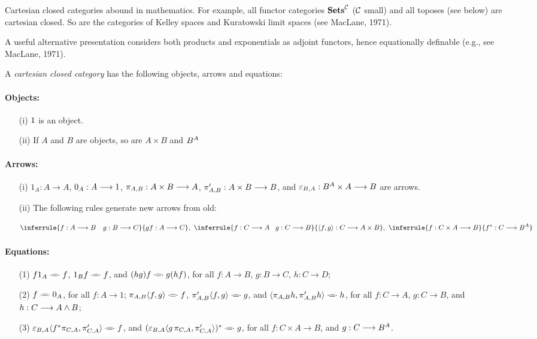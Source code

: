 Cartesian closed categories abound in mathematics. For example, all
functor categories ${\mathbf {Sets}}^{\mathcal C}$ ($\mathcal C$ small) and all toposes (see below) are cartesian
closed. So are the categories of Kelley spaces and Kuratowski limit spaces
(see MacLane, 1971).

A useful alternative presentation considers both products and exponentials
as adjoint functors, hence equationally definable (e.g., see MacLane, 1971).

\def\deq{\mathop{\cdot\mkern-5mu=\mkern-5mu\cdot}}

\begin{defn}
A {\em cartesian closed category} has the following objects,
arrows and equations:

\paragraph{Objects:}
\begin{enumerate}
\item[(i)] $1$ is an object.
\item[(ii)] If $A$ and $B$ are objects, so are $A \times B$ and $B^{A}$
\end{enumerate}

\paragraph{Arrows:}
\begin{enumerate}
\item[(i)] $1_A: A \to A$, $0_A: A \longrightarrow 1$, $\pi_{A,B}: A \times B \longrightarrow A$, 
$\pi'_{A,B}: A \times B \longrightarrow B$,
and $\varepsilon_{B,A}: B^{A} \times A \longrightarrow B$ are arrows.

\item[(ii)] The following rules generate new arrows from old:

\[
\inferrule {f: A \to B \quad g: B \to C}{gf: A \to C},\,\,
\inferrule {f: C \to A \quad\! g: C \to B}{\la f, g \ra: C \to A \times B}, \,\,
\inferrule {f: C \times A \to B}{f^*: C \to \fexpBA}
\]

\end{enumerate}

\paragraph{Equations:}
\begin{enumerate}
\item[(1)] $f1_A \mathrel{\cdot\!\!=\!\!\cdot} f$, $1_Bf \mathrel{\cdot\!\!=\!\!\cdot} f$, and $(hg)f \mathrel{\cdot\!\!=\!\!\cdot} g(hf)$,
for all $f:A \to B$, $g:B \to C$, $h: C\to D$;
\item[(2)] $f \mathrel{\cdot\!\!=\!\!\cdot} 0_A$, for all $f: A \to 1$;
$\pi_{A,B}\langle f,g \rangle \mathrel{\cdot\!\!=\!\!\cdot} f$, $\pi'_{A,B}\langle f,g \rangle \mathrel{\cdot\!\!=\!\!\cdot} g$, and
$\langle\pi_{A,B} h, \pi'_{A,B} h\rangle \mathrel{\cdot\!\!=\!\!\cdot} h$,
for all $f:C \to A$, $g:C \to B$, and $h: C\longrightarrow A\wedge B$;
\item[(3)] $\varepsilon_{B,A}\langle f^*\pi_{C,A}, \pi'_{C,A} \rangle \mathrel{\cdot\!\!=\!\!\cdot} f$, and
$(\varepsilon_{B,A}\langle g\,\pi_{C,A}, \pi'_{C,A} \rangle)^* \mathrel{\cdot\!\!=\!\!\cdot} g$,
for all $f: C\times A \to B$, and $g: C \longrightarrow B^{A}$.
\end{enumerate}

\end{defn}
